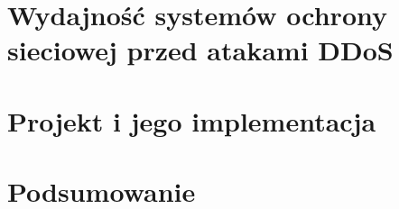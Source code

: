 \documentclass[a4paper,12pt,oneside,openany,titlepage]{book}
\begin{document}




\tableofcontents





\chapter{Wydajność systemów ochrony sieciowej przed atakami DDoS}

\chapter{Projekt i jego implementacja}



\chapter{Podsumowanie}
\end{document}
